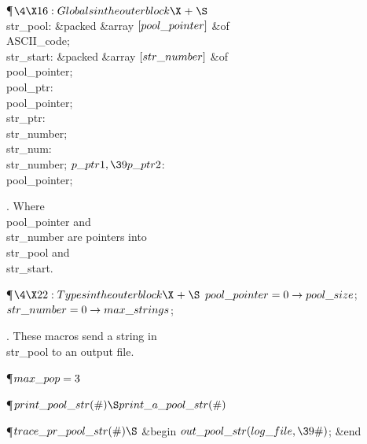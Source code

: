 \Y\P$\4\X16:Globals in the outer block\X\mathrel{+}\S$\6
\4\\{str\_pool}: \&{packed} \&{array} $[\\{pool\_pointer}]$ \1\&{of}\5
\\{ASCII\_code};\2\6
\4\\{str\_start}: \&{packed} \&{array} $[\\{str\_number}]$ \1\&{of}\5
\\{pool\_pointer};\2\6
\4\\{pool\_ptr}: \\{pool\_pointer};\6
\4\\{str\_ptr}: \\{str\_number};\6
\4\\{str\_num}: \\{str\_number};\6
\4$\\{p\_ptr1},\39\\{p\_ptr2}$: \\{pool\_pointer};\par
\fi

.
Where \\{pool\_pointer} and \\{str\_number} are pointers into \\{str\_pool} and
\\{str\_start}.

\Y\P$\4\X22:Types in the outer block\X\mathrel{+}\S$\6
$\\{pool\_pointer}=0\to\\{pool\_size}$;\6
$\\{str\_number}=0\to\\{max\_strings}$;\par
\fi

.
These macros send a string in \\{str\_pool} to an output file.

\Y\P\D {}$\\{max\_pop}=3$\Y\par
\P\D {}$\\{print\_pool\_str}(\#)\S\\{print\_a\_pool\_str}(\#)$\Y\par
\P\D {}$\\{trace\_pr\_pool\_str}(\#)\S$\1\6
\&{begin} $\\{out\_pool\_str}(\\{log\_file},\39\#)$;\6
\&{end}\2\par
\fi

